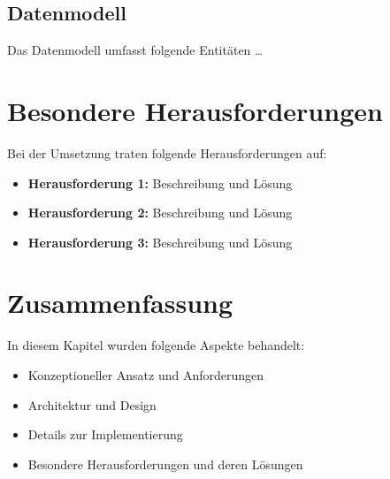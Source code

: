 
\subsection{Datenmodell}

Das Datenmodell umfasst folgende Entitäten \dots

\section{Besondere Herausforderungen}
\label{sec:herausforderungen}

Bei der Umsetzung traten folgende Herausforderungen auf:
\begin{itemize}
    \item \textbf{Herausforderung 1:} Beschreibung und Lösung
    \item \textbf{Herausforderung 2:} Beschreibung und Lösung
    \item \textbf{Herausforderung 3:} Beschreibung und Lösung
\end{itemize}

\section{Zusammenfassung}
\label{sec:hauptteil-zusammenfassung}

In diesem Kapitel wurden folgende Aspekte behandelt:
\begin{itemize}
    \item Konzeptioneller Ansatz und Anforderungen
    \item Architektur und Design
    \item Details zur Implementierung
    \item Besondere Herausforderungen und deren Lösungen
\end{itemize}

